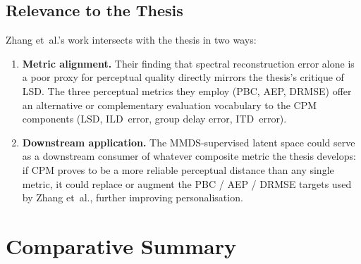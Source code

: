 \documentclass[12pt,a4paper]{article}
\begin{document}
\subsection{Relevance to the Thesis}

Zhang et~al.'s work intersects with the thesis in two ways:

\begin{enumerate}
  \item \textbf{Metric alignment.}
        Their finding that spectral reconstruction error alone is a poor
        proxy for perceptual quality directly mirrors the thesis's
        critique of LSD.  The three perceptual metrics they employ
        (PBC, AEP, DRMSE) offer an alternative or complementary
        evaluation vocabulary to the CPM components (LSD, ILD~error,
        group delay error, ITD~error).

  \item \textbf{Downstream application.}
        The MMDS-supervised latent space could serve as a downstream
        consumer of whatever composite metric the thesis develops:
        if CPM proves to be a more reliable perceptual distance than
        any single metric, it could replace or augment the PBC / AEP /
        DRMSE targets used by Zhang et~al., further improving
        personalisation.
\end{enumerate}


\newpage
\section{Comparative Summary}
\end{document}

